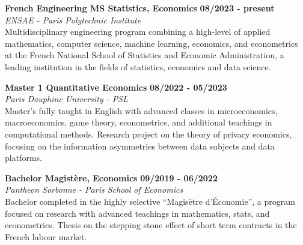 \begin{flushleft}
\raisebox{-.6ex}{HIGHER EDUCATION} \hrulefill
\end{flushleft}\vspace{-0.1cm}

    \noindent\textbf{French Engineering MS \textbar\space Statistics,  Economics}
    \hfill
    \textbf{08/2023 - present} \\
    \emph{ENSAE - Paris Polytechnic Institute}\\
    Multidisciplinary engineering program combining a high-level of applied mathematics, computer science, machine learning, economics, and  econometrics at the French National School of Statistics and Economic Administration, a leading institution in the fields of statistics, economics and data science.  

    \noindent\textbf{Master 1 \textbar\space Quantitative Economics}
    \hfill
    \textbf{08/2022 - 05/2023} \\
    \emph{Paris Dauphine University - PSL}\\
    Master's fully taught in English with advanced classes in microeconomics, macroeconomics, game theory,  econometrics, and additional teachings in computational methods. Research project on the theory of privacy economics, focusing on the information asymmetries between data subjects and data platforms. 

    \noindent\textbf{Bachelor \textbar\space Magistère, Economics}
    \hfill
    \textbf{09/2019 - 06/2022} \\
    \emph{Pantheon Sorbonne - Paris School of Economics}\\
    Bachelor completed in the highly selective “Magisètre d'Économie”, a program focused on research with advanced teachings in mathematics, stats, and econometrics. Thesis on the stepping stone effect of short term contracts in the French labour market.

\begin{flushleft}\vspace{-0.1cm}
\raisebox{-.6ex}{WORK \& RESEARCH EXPERIENCE} \hrulefill
\end{flushleft}\vspace{-0.1cm}

